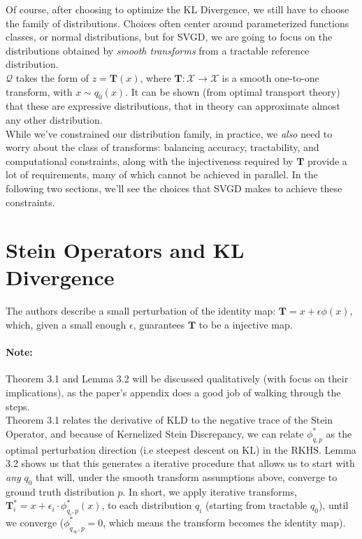 \documentclass[12pt]{article}
\begin{document}
Of course, after choosing to optimize the KL Divergence, we still have to choose the family of distributions. Choices often center around parameterized functions classes, or normal distributions, but for SVGD, we are going to focus on the distributions obtained by \textit{smooth transforms} from a tractable reference distribution. \\

\noindent $\mathcal{Q}$ takes the form of $z = \textbf{T}(x)$, where $\textbf{T}: \mathcal{X} \rightarrow \mathcal{X}$ is a smooth one-to-one transform, with $x \sim q_0(x)$. It can be shown (from optimal transport theory) that these are expressive distributions, that in theory can approximate almost any other distribution. \\

\noindent While we've constrained our distribution family, in practice, we \textit{also} need to worry about the class of transforms: balancing accuracy, tractability, and computational constraints, along with the injectiveness required by $\mathbf{T}$ provide a lot of requirements, many of which cannot be achieved in parallel. In the following two sections, we'll see the choices that SVGD makes to achieve these constraints.

\section{Stein Operators and KL Divergence}

The authors describe a small perturbation of the identity map: $\mathbf{T} = x + \epsilon \phi(x)$, which, given a small enough $\epsilon$, guarantees $\mathbf{T}$ to be a injective map.

\paragraph{Note:} Theorem 3.1 and Lemma 3.2 will be discussed qualitatively (with focus on their implications), as the paper's appendix does a good job of walking through the steps. \\

\noindent Theorem 3.1 relates the derivative of KLD to the negative trace of the Stein Operator, and because of Kernelized Stein Discrepancy, we can relate $\phi_{q, p}^*$ as the optimal perturbation direction (i.e steepest descent on KL) in the RKHS. Lemma 3.2 shows us that this generates a iterative procedure that allows us to start with \textit{any} $q_0$ that will, under the smooth transform assumptions above, converge to ground truth distribution $p$. In short, we apply iterative transforms, $\mathbf{T}^*_i = x + \epsilon_i \cdot \phi^*_{q_i, p}(x)$, to each distribution $q_i$ (starting from tractable $q_0$), until we converge ($\phi_{q_\infty, p}^* = 0$, which means the transform becomes the identity map).  \\
\end{document}

